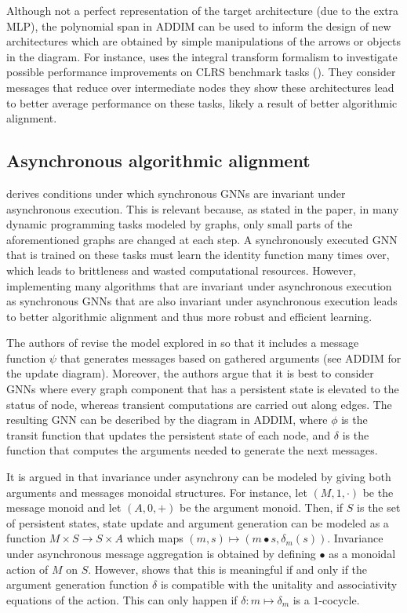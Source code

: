 \documentclass[11pt,a4paper,openright,twoside]{report}
\theoremstyle{plain}
\theoremstyle{definition}
\begin{document}
Although not a perfect representation of the target architecture (due to the extra MLP), the polynomial span in ADDIM can be used to inform the design of new architectures which are obtained by simple manipulations of the arrows or objects in the diagram. For instance, \cite{dudzik2022graph} uses the integral transform formalism to investigate possible performance improvements on CLRS benchmark tasks (\cite{velivckovic2022clrs}). They consider messages that reduce over intermediate nodes they show these architectures lead to better average performance on these tasks, likely a result of better algorithmic alignment.


\subsection{Asynchronous algorithmic alignment}

\cite{dudzik2024asynchronous} derives conditions under which synchronous GNNs are invariant under asynchronous execution. This is relevant because, as stated in the paper, in many dynamic programming tasks modeled by graphs, only small parts of the aforementioned graphs are changed at each step. A synchronously executed GNN that is trained on these tasks must learn the identity function many times over, which leads to brittleness and wasted computational resources. However, implementing many algorithms that are invariant under asynchronous execution as synchronous GNNs that are also invariant under asynchronous execution leads to better algorithmic alignment and thus more robust and efficient learning.

The authors of \cite{dudzik2024asynchronous} revise the model explored in \cite{dudzik2022graph} so that it includes a message function $\psi$ that generates messages based on gathered arguments (see ADDIM for the update diagram). Moreover, the authors argue that it is best to consider GNNs where every graph component that has a persistent state is elevated to the status of node, whereas transient computations are carried out along edges. The resulting GNN can be described by the diagram in ADDIM, where $\phi$ is the transit function that updates the persistent state of each node, and $\delta$ is the function that computes the arguments needed to generate the next messages.

It is argued in \cite{dudzik2024asynchronous} that invariance under asynchrony can be modeled by giving both arguments and messages monoidal structures. For instance, let $(M, 1, \cdot)$ be the message monoid and let $(A, 0, +)$ be the argument monoid. Then, if $S$ is the set of persistent states, state update and argument generation can be modeled as a function $M \times S \to S \times A$ which maps $(m,s) \mapsto (m \bullet s, \delta_m(s))$. Invariance under asynchronous message aggregation is obtained by defining $\bullet$ as a monoidal action of $M$ on $S$. However, \cite{dudzik2024asynchronous} shows that this is meaningful if and only if the argument generation function $\delta$ is compatible with the unitality and associativity equations of the action. This can only happen if $\delta: m \mapsto \delta_m$ is a $1$-cocycle.
\end{document}

